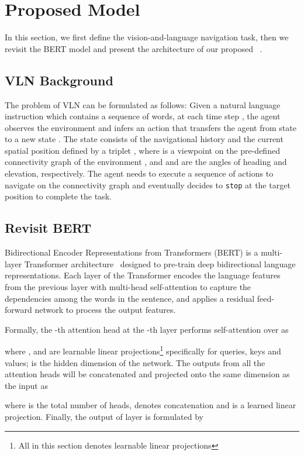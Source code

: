 \documentclass[final]{cvpr}
\begin{document}
 \section{Proposed Model} 
\label{sec:rvlnbert}

In this section, we first define the vision-and-language navigation task, then we revisit the BERT model \cite{devlin2019bert} and present the architecture of our proposed \vlnbert~.

\subsection{VLN Background}
The problem of VLN can be formulated as follows: Given a natural language instruction  which contains a sequence of words, at each time step , the agent observes the environment and infers an action  that transfers the agent from state  to a new state . The state consists of the navigational history and the current spatial position defined by a triplet , where  is a viewpoint on the pre-defined connectivity graph of the environment \cite{anderson2018vision}, and  and  are the angles of heading and elevation, respectively. The agent needs to execute a sequence of actions to navigate on the connectivity graph and eventually decides to \texttt{stop} at the target position to complete the task.

\subsection{Revisit BERT}
Bidirectional Encoder Representations from Transformers (BERT) \cite{devlin2019bert} is a multi-layer Transformer architecture~\cite{vaswani2017attention} designed to pre-train deep bidirectional language representations.
Each layer of the Transformer encodes the language features from the previous layer  with multi-head self-attention to capture the dependencies among the  words in the sentence, and applies a residual feed-forward network to process the output features.

Formally, the -th attention head at the -th layer performs self-attention over  as

where ,  and  are learnable linear projections\footnote{All  in this section denotes learnable linear projections} specifically for queries, keys and values;  is the hidden dimension of the network.
The outputs from all the attention heads will be concatenated and projected onto the same dimension as the input as

where  is the total number of heads,  denotes concatenation and  is a learned linear projection.
Finally, the output of layer  is formulated by
\end{document}
